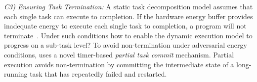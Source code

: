 \noindent\emph{C3) Ensuring Task Termination:} A static task decomposition model assumes that each
single task can execute to completion. If the hardware energy buffer provides
inadequate energy to execute each single task to completion, a program will not
terminate~\cite{cleancut_2018}. Under such conditions how to enable the dynamic execution model to progress on a sub-task level? To avoid non-termination under adversarial
energy conditions, \sys uses a novel timer-based {\em partial task commit} mechanism.
Partial execution avoids non-termination by committing the intermediate state of a long-running
task that has repeatedly failed and restarted. 

%

